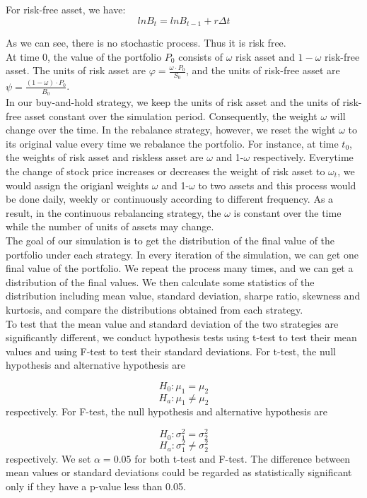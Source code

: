 \documentclass[
10pt, %
a4paper, %
oneside, %
headinclude,footinclude, %
BCOR5mm, %
]{scrartcl}
\begin{document}
For risk-free asset, we have:
$$ lnB_t = lnB_{t-1} + r\Delta t $$

As we can see, there is no stochastic process. Thus it is risk free. \\

At time 0, the value of the portfolio $P_0$ consists of $\omega$ risk asset and $1-\omega$ risk-free asset. The units of risk asset are $\varphi = \frac{\omega\cdot P_0}{S_0} $, and the units of risk-free asset are $\psi =  \frac{(1-\omega)\cdot P_0}{B_0}$. \\

In our buy-and-hold strategy, we keep the units of risk asset and the units of risk-free asset constant over the simulation period. Consequently, the weight $\omega$ will change over the time. In the rebalance strategy, however, we reset the wight $\omega$ to its original value every time we rebalance the portfolio. For instance, at time $t_0$, the weights of risk asset and riskless asset are $\omega$ and 1-$\omega$ respectively. Everytime the change of stock price increases or decreases the weight of risk asset to $\omega_t$, we would assign the origianl weights $\omega$ and 1-$\omega$ to two assets and this process would be done daily, weekly or continuously according to different frequency.  As a result, in the continuous rebalancing strategy, the $\omega$ is constant over the time while the number of units of assets may change.\\

The goal of our simulation is to get the distribution of the final value of the portfolio under each strategy. In every iteration of the simulation, we can get one final value of the portfolio. We repeat the process many times, and we can get a distribution of the final values. We then calculate some statistics of the distribution including mean value, standard deviation, sharpe ratio, skewness and kurtosis, and compare the distributions obtained from each strategy.\\

To test that the mean value and standard deviation of the two strategies are significantly different, we conduct hypothesis tests using t-test to test their mean values and using F-test to test their standard deviations. For t-test, the null hypothesis and alternative hypothesis are

$$H_0: \mu_1=\mu_2$$
$$H_a: \mu_1\neq\mu_2$$ 
respectively. For F-test, the null hypothesis and alternative hypothesis are

$$H_0: \sigma^2_1=\sigma^2_2$$
$$H_a: \sigma^2_1\neq\sigma^2_2$$
respectively. We set $\alpha=0.05$ for both t-test and F-test. The difference between mean values or standard deviations could be regarded as statistically significant only if they have a p-value less than 0.05.
\end{document}

